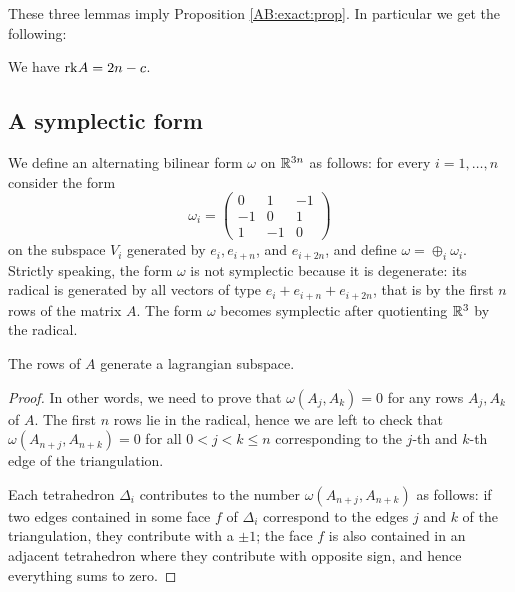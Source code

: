These three lemmas imply Proposition \ref{AB:exact:prop}. In particular we get the following:

\begin{cor} \label{rk:A:cor}
We have ${\rm rk} A = 2n-c$.
\end{cor}

\subsection{A symplectic form} \label{symplectic:form:subsection}
We define an alternating bilinear form $\omega$ on $\mathbb{R}^{3n}$ as follows: for every $i=1,\ldots, n$ consider the form
$$\omega_i = \begin{pmatrix}
0 & 1 & -1 \\
-1 & 0 & 1 \\
1 & -1 & 0
\end{pmatrix}
$$
on the subspace $V_i$ generated by $e_i, e_{i+n}$, and $e_{i+2n}$, and define $\omega = \oplus_i \omega_i$. Strictly speaking, the form $\omega$ is not symplectic because it is degenerate: its radical is generated by all vectors of type $e_i+e_{i+n} + e_{i+2n}$, that is by the first $n$ rows of the matrix $A$. The form $\omega$ becomes symplectic after quotienting $\mathbb{R}^3$ by the radical.

\begin{prop} \label{rows:lagrangian:prop}
The rows of $A$ generate a lagrangian subspace.
\end{prop}
\begin{proof}
In other words, we need to prove that $\omega(A_j, A_k)=0$ for any rows $A_j, A_k$ of $A$. The first $n$ rows lie in the radical, hence we are left to check that $\omega(A_{n+j}, A_{n+k})=0$ for all $0 < j < k \leqslant n$ corresponding to the $j$-th and $k$-th edge of the triangulation. 

Each tetrahedron $\Delta_i$ contributes to the number $\omega(A_{n+j}, A_{n+k})$ as follows: if two edges contained in some face $f$ of $\Delta_i$ correspond to the edges $j$ and $k$ of the triangulation, they contribute with a $\pm 1$; the face $f$ is also contained in an adjacent tetrahedron where they contribute with opposite sign, and hence everything sums to zero.
\end{proof}

